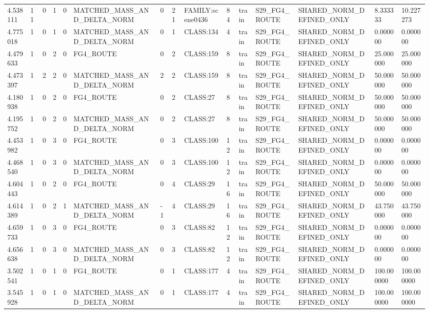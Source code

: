 \begin{tabular}{lllllllllllllll}
4.538111 & 11 & 0 & 1 & 0 & MATCHED\_MASS\_AND\_DELTA\_NORM & 0 & 21 & FAMILY:scene0436 & 84 & train & S29\_FG4\_ROUTE & SHARED\_NORM\_DEFINED\_ONLY & 8.333333 & 10.227273 \\
4.775018 & 1 & 0 & 1 & 0 & MATCHED\_MASS\_AND\_DELTA\_NORM & 0 & 1 & CLASS:134 & 4 & train & S29\_FG4\_ROUTE & SHARED\_NORM\_DEFINED\_ONLY & 0.000000 & 0.000000 \\
4.479633 & 1 & 0 & 2 & 0 & FG4\_ROUTE & 0 & 2 & CLASS:159 & 8 & train & S29\_FG4\_ROUTE & SHARED\_NORM\_DEFINED\_ONLY & 25.000000 & 25.000000 \\
4.473397 & 1 & 2 & 2 & 0 & MATCHED\_MASS\_AND\_DELTA\_NORM & 2 & 2 & CLASS:159 & 8 & train & S29\_FG4\_ROUTE & SHARED\_NORM\_DEFINED\_ONLY & 50.000000 & 50.000000 \\
4.180938 & 1 & 0 & 2 & 0 & FG4\_ROUTE & 0 & 2 & CLASS:27 & 8 & train & S29\_FG4\_ROUTE & SHARED\_NORM\_DEFINED\_ONLY & 50.000000 & 50.000000 \\
4.195752 & 1 & 0 & 2 & 0 & MATCHED\_MASS\_AND\_DELTA\_NORM & 0 & 2 & CLASS:27 & 8 & train & S29\_FG4\_ROUTE & SHARED\_NORM\_DEFINED\_ONLY & 50.000000 & 50.000000 \\
4.453982 & 1 & 0 & 3 & 0 & FG4\_ROUTE & 0 & 3 & CLASS:100 & 12 & train & S29\_FG4\_ROUTE & SHARED\_NORM\_DEFINED\_ONLY & 0.000000 & 0.000000 \\
4.468540 & 1 & 0 & 3 & 0 & MATCHED\_MASS\_AND\_DELTA\_NORM & 0 & 3 & CLASS:100 & 12 & train & S29\_FG4\_ROUTE & SHARED\_NORM\_DEFINED\_ONLY & 0.000000 & 0.000000 \\
4.604443 & 1 & 0 & 2 & 0 & FG4\_ROUTE & 0 & 4 & CLASS:29 & 16 & train & S29\_FG4\_ROUTE & SHARED\_NORM\_DEFINED\_ONLY & 50.000000 & 50.000000 \\
4.614389 & 1 & 0 & 2 & 1 & MATCHED\_MASS\_AND\_DELTA\_NORM & -1 & 4 & CLASS:29 & 16 & train & S29\_FG4\_ROUTE & SHARED\_NORM\_DEFINED\_ONLY & 43.750000 & 43.750000 \\
4.659733 & 1 & 0 & 3 & 0 & FG4\_ROUTE & 0 & 3 & CLASS:82 & 12 & train & S29\_FG4\_ROUTE & SHARED\_NORM\_DEFINED\_ONLY & 0.000000 & 0.000000 \\
4.656638 & 1 & 0 & 3 & 0 & MATCHED\_MASS\_AND\_DELTA\_NORM & 0 & 3 & CLASS:82 & 12 & train & S29\_FG4\_ROUTE & SHARED\_NORM\_DEFINED\_ONLY & 0.000000 & 0.000000 \\
3.502541 & 1 & 0 & 1 & 0 & FG4\_ROUTE & 0 & 1 & CLASS:177 & 4 & train & S29\_FG4\_ROUTE & SHARED\_NORM\_DEFINED\_ONLY & 100.000000 & 100.000000 \\
3.545928 & 1 & 0 & 1 & 0 & MATCHED\_MASS\_AND\_DELTA\_NORM & 0 & 1 & CLASS:177 & 4 & train & S29\_FG4\_ROUTE & SHARED\_NORM\_DEFINED\_ONLY & 100.000000 & 100.000000 \\

\end{tabular}
